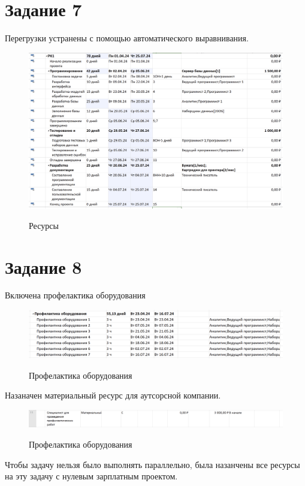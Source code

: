 \section{Задание 7}

Перегрузки устранены с помощью автоматического выравнивания.

\begin{figure}[ht!]
	\includegraphics[width=0.75\linewidth]{assets/images/7-tasks.png}
	\label{fig:r2}
	\caption{Ресурсы}
\end{figure}
\FloatBarrier


\section{Задание 8}

Включена профелактика оборудования

\begin{figure}[ht!]
	\includegraphics[width=0.75\linewidth]{assets/images/8.1-check.png}
	\label{fig:r2}
	\caption{Профелактика оборудования}
\end{figure}
\FloatBarrier

Назаначен материальный ресурс для аутсорсной компании.


\begin{figure}[ht!]
	\includegraphics[width=0.75\linewidth]{assets/images/8.2-outsource.png}
	\label{fig:r2}
	\caption{Профелактика оборудования}
\end{figure}
\FloatBarrier

Чтобы задачу нельзя было выполнять параллельно, была назанчены все ресурсы на эту задачу с нулевым зарплатным проектом.


